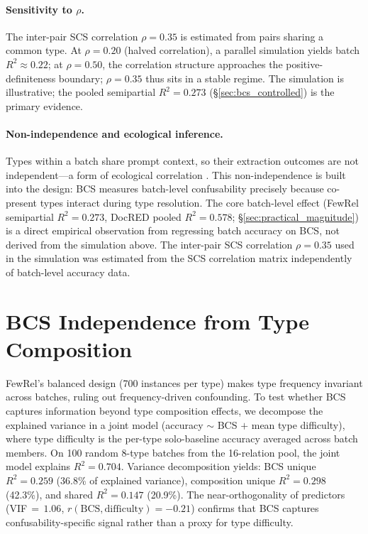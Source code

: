 \documentclass[11pt]{article}
\begin{document}
\paragraph{Sensitivity to $\rho$.}
The inter-pair SCS correlation $\rho = 0.35$ is estimated from pairs sharing a common type. At $\rho = 0.20$ (halved correlation), a parallel simulation yields batch $R^2 \approx 0.22$; at $\rho = 0.50$, the correlation structure approaches the positive-definiteness boundary; $\rho = 0.35$ thus sits in a stable regime. The simulation is illustrative; the pooled semipartial $R^2 = 0.273$ (\S\ref{sec:bcs_controlled}) is the primary evidence.

\paragraph{Non-independence and ecological inference.}
Types within a batch share prompt context, so their extraction outcomes are not independent---a form of ecological correlation \citep{robinson-1950-ecological}. This non-independence is built into the design: BCS measures batch-level confusability precisely because co-present types interact during type resolution. The core batch-level effect (FewRel semipartial $R^2 = 0.273$, DocRED pooled $R^2 = 0.578$; \S\ref{sec:practical_magnitude}) is a direct empirical observation from regressing batch accuracy on BCS, not derived from the simulation above. The inter-pair SCS correlation $\rho = 0.35$ used in the simulation was estimated from the SCS correlation matrix independently of batch-level accuracy data.

\section{BCS Independence from Type Composition}
\label{app:bcs-composition}

FewRel's balanced design (700 instances per type) makes type frequency invariant across batches, ruling out frequency-driven confounding. To test whether BCS captures information beyond type composition effects, we decompose the explained variance in a joint model (accuracy $\sim$ BCS $+$ mean type difficulty), where type difficulty is the per-type solo-baseline accuracy averaged across batch members. On 100 random 8-type batches from the 16-relation pool, the joint model explains $R^2 = 0.704$. Variance decomposition yields: BCS unique $R^2 = 0.259$ (36.8\% of explained variance), composition unique $R^2 = 0.298$ (42.3\%), and shared $R^2 = 0.147$ (20.9\%). The near-orthogonality of predictors (VIF${}\,=\,1.06$, $r(\text{BCS}, \text{difficulty}) = -0.21$) confirms that BCS captures confusability-specific signal rather than a proxy for type difficulty.
\end{document}
